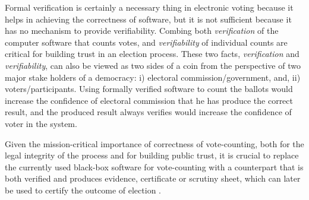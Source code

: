    \noindent
   Formal verification is certainly a necessary thing in electronic voting because 
   it helps in achieving the correctness of software, but it is not sufficient because
   it has no mechanism to provide  verifiability.
   Combing both \emph{verification} of the
	computer software that counts votes, and
	\emph{verifiability} of individual counts are critical for
	building trust in an election process. These two facts, 
	 \emph{verification}  and \emph{verifiability}, 
	 can also be viewed as 
    two sides of a coin from the perspective of two major stake holders of 
    a democracy: i) electoral commission/government, and, ii) voters/participants.  
    Using formally 
    verified software to count the ballots would increase the confidence 
    of electoral commission that he has produce the correct result, and 
    the produced result always verifies would increase the confidence
    of voter in the system. 
	 
	 
	Given the mission-critical importance of
	 correctness of vote-counting,
	both for the legal integrity of the process and for
	building public trust,  it is crucial to replace the
	currently used black-box software for vote-counting with a
	counterpart that is both verified and produces 
	evidence, certificate or scrutiny sheet, which can later be used to certify
	the outcome of election \citep{Bernhard:2017:PES} \citep{Rivest:2008:PTRS}.
	
	
        
    
    
   
	
	
